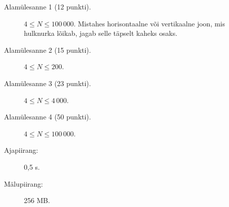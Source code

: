 ﻿\documentclass{boi2014-et}
\begin{document}
    \Scoring

    \begin{description}
        \item[Alamülesanne 1 (12 punkti).] $4 \le N \le 100\,000$.
            Mistahes horisontaalne või vertikaalne joon, mis hulknurka lõikab,
            jagab selle täpselt kaheks osaks.
        \item[Alamülesanne 2 (15 punkti).] $4 \le N \le 200$.
        \item[Alamülesanne 3 (23 punkti).] $4 \le N \le 4\,000$.
        \item[Alamülesanne 4 (50 punkti).] $4 \le N \le 100\,000$.
    \end{description}

    \Constraints

    \begin{description}
        \item[Ajapiirang:] 0,5 s.
        \item[Mälupiirang:] 256 MB.
    \end{description}
\end{document}
